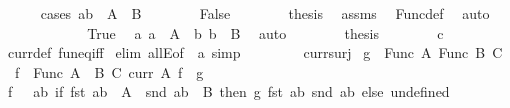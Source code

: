 \begin{isabellebody}
\ \ \ \ \isamarkupfalse%
\ {\isacharparenleft}{\kern0pt}cases\ {\isachardoublequoteopen}{\isacharparenleft}{\kern0pt}a{\isacharcomma}{\kern0pt}b{\isacharparenright}{\kern0pt}\ {\isasymin}\ A\ {\isasymtimes}\ B{\isachardoublequoteclose}{\isacharparenright}{\kern0pt}\isanewline
\ \ \ \ \ \ \isamarkupfalse%
\ False\isanewline
\ \ \ \ \ \ \isamarkupfalse%
\ {\isacharquery}{\kern0pt}thesis\ \isamarkupfalse%
\ assms\ \isamarkupfalse%
\ Func{\isacharunderscore}{\kern0pt}def\ \isamarkupfalse%
\ auto\isanewline
\ \ \ \ \isamarkupfalse%
\isanewline
\ \ \ \ \ \ \isamarkupfalse%
\ True\ \isamarkupfalse%
\ a{\isacharcolon}{\kern0pt}\ {\isachardoublequoteopen}a\ {\isasymin}\ A{\isachardoublequoteclose}\ \ b{\isacharcolon}{\kern0pt}\ {\isachardoublequoteopen}b\ {\isasymin}\ B{\isachardoublequoteclose}\ \isamarkupfalse%
\ auto\isanewline
\ \ \ \ \ \ \isamarkupfalse%
\ {\isacharquery}{\kern0pt}thesis\isanewline
\ \ \ \ \ \ \isamarkupfalse%
\ c\ \isamarkupfalse%
\ curr{\isacharunderscore}{\kern0pt}def\ fun{\isacharunderscore}{\kern0pt}eq{\isacharunderscore}{\kern0pt}iff\ \isamarkupfalse%
{\isacharparenleft}{\kern0pt}elim\ allE{\isacharbrackleft}{\kern0pt}of\ {\isacharunderscore}{\kern0pt}\ a{\isacharbrackright}{\kern0pt}{\isacharparenright}{\kern0pt}\ simp\isanewline
\ \ \ \ \isamarkupfalse%
\isanewline
\ \ \isamarkupfalse%
\isanewline
{}\isamarkupfalse%
%
\endisatagproof
{\isafoldproof}%
%
\isadelimproof
\isanewline
%
\endisadelimproof
\isanewline
{}\isamarkupfalse%
\ curr{\isacharunderscore}{\kern0pt}surj{\isacharcolon}{\kern0pt}\isanewline
{}\ {\isachardoublequoteopen}g\ {\isasymin}\ Func\ A\ {\isacharparenleft}{\kern0pt}Func\ B\ C{\isacharparenright}{\kern0pt}{\isachardoublequoteclose}\isanewline
{}\ {\isachardoublequoteopen}{\isasymexists}\ f\ {\isasymin}\ Func\ {\isacharparenleft}{\kern0pt}A\ {\isasymtimes}\ B{\isacharparenright}{\kern0pt}\ C{\isachardot}{\kern0pt}\ curr\ A\ f\ {\isacharequal}{\kern0pt}\ g{\isachardoublequoteclose}\isanewline
%
\isadelimproof
%
\endisadelimproof
%
\isatagproof
{}\isamarkupfalse%
\isanewline
\ \ \isamarkupfalse%
\ {\isacharquery}{\kern0pt}f\ {\isacharequal}{\kern0pt}\ {\isachardoublequoteopen}{\isasymlambda}\ ab{\isachardot}{\kern0pt}\ if\ fst\ ab\ {\isasymin}\ A\ {\isasymand}\ snd\ ab\ {\isasymin}\ B\ then\ g\ {\isacharparenleft}{\kern0pt}fst\ ab{\isacharparenright}{\kern0pt}\ {\isacharparenleft}{\kern0pt}snd\ ab{\isacharparenright}{\kern0pt}\ else\ undefined{\isachardoublequoteclose}\isanewline

\end{isabellebody}
